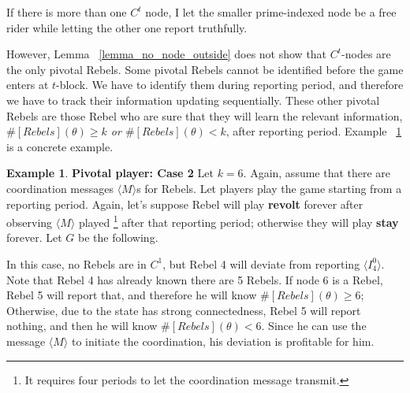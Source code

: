 \documentclass[12pt,letterpaper]{article}
\newtheorem*{main result}{Main Result}
\theoremstyle{definition}
\newtheorem{example}{Example}[section]
\theoremstyle{remark}
\theoremstyle{claim}
\begin{document}
If there is more than one $C^t$ node, I let the smaller prime-indexed node be a free rider while letting the other one report truthfully.

However, Lemma ~\ref{lemma_no_node_outside} does not show that $C^t$-nodes are the only pivotal Rebels. Some pivotal Rebels cannot be identified before the game enters at $t$-block. We have to identify them during reporting period, and therefore we have to track their information updating sequentially. These other pivotal Rebels are those Rebel who are sure that they will learn the relevant information, \textit{$\#[Rebels](\theta)\geq k$ or $\#[Rebels](\theta)< k$}, after reporting period. Example ~\ref{ex_pivotal_2} is a concrete example.

\begin{example} \label{ex_pivotal_2}\textbf{Pivotal player: Case 2}
Let $k=6$. Again, assume that there are coordination messages $\langle M\rangle$s for Rebels. Let players play the game starting from a reporting period. Again, let's suppose Rebel will play \textbf{revolt} forever after observing $\langle M \rangle$ played \footnote{It requires four periods to let the coordination message transmit.} after that reporting period; otherwise they will play \textbf{stay} forever. Let $G$ be the following.

\begin{center}
\end{center}

In this case, no Rebels are in $C^1$, but Rebel 4 will deviate from reporting $\langle I^0_4 \rangle$. Note that Rebel 4 has already known there are 5 Rebels. If node 6 is a Rebel, Rebel 5 will report that, and therefore he will know $\#[Rebels](\theta)\geq 6$; Otherwise, due to the state has strong connectedness, Rebel 5 will report nothing, and then he will know $\#[Rebels](\theta)< 6$. Since he can use the message $\langle M \rangle$ to initiate the coordination, his deviation is profitable for him.
\end{example}
\end{document}
